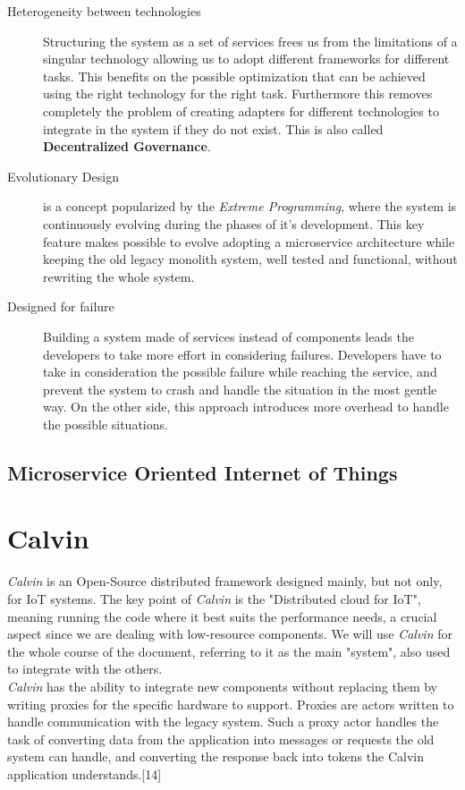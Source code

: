 \begin{description}
  \item[Heterogeneity between technologies] Structuring the system as a set
  of services frees us from the limitations of a singular technology allowing
  us to adopt different frameworks for different tasks. This benefits on the
  possible optimization that can be achieved using the right technology for the
  right task. Furthermore this removes completely the problem of creating adapters
  for different technologies to integrate in the system if they do not exist. This is
  also called \textbf{Decentralized Governance}.
  \item[Evolutionary Design] is a concept popularized by the \textit{Extreme Programming},
  where the system is continuously evolving during the phases of it's development.
  This key feature makes possible to evolve adopting a microservice architecture while
  keeping the old legacy monolith system, well tested and functional, without rewriting
  the whole system.
  \item[Designed for failure] Building a system made of services instead of components
  leads the developers to take more effort in considering failures. Developers have
  to take in consideration the possible failure while reaching the service, and
  prevent the system to crash and handle the situation in the most gentle way. On the
  other side, this approach introduces more overhead to handle the possible situations.


\end{description}


\subsection{Microservice Oriented Internet of Things}


\section{Calvin}
  \textit{Calvin} is an Open-Source distributed framework designed mainly, but not only,
  for IoT systems. The key point of \textit{Calvin} is the "Distributed cloud for IoT", meaning
  running the code where it best suits the performance needs, a crucial aspect since we are
  dealing with low-resource components. We will use \textit{Calvin} for the whole course of the document,
  referring to it as the main "system", also used to integrate with the others. \\
  \textit{Calvin} has the ability to integrate new components without replacing them by writing
  proxies for the specific hardware to support. Proxies are actors written to handle
  communication with the legacy system. Such a proxy actor handles the task of converting data
  from the application into messages or requests the old system can handle, and converting the
  response back into tokens the Calvin application understands.[14]

